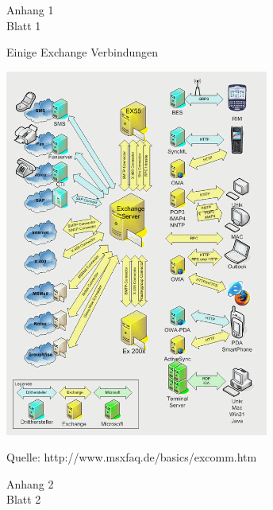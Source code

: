 \begin{flushright}
Anhang 1\\
Blatt 1\\
\end{flushright}

\noindent Einige Exchange Verbindungen
\begin{flushleft}
\includegraphics[width=0.65\textwidth]{Abbildungen/Exchange_Verbindungen.png}
\end{flushleft}
\label{Exchange Verbindung}
\noindent Quelle: http://www.msxfaq.de/basics/excomm.htm

\newpage

\begin{flushright}
Anhang 2\\
Blatt 2\\
\end{flushright}

